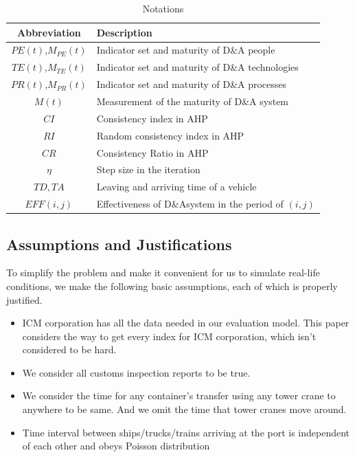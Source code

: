 \documentclass{mcmthesis}
\begin{document}
\begin{table}[!htbp]
    \small
    \setlength{\abovecaptionskip}{0cm}
    \setlength{\belowcaptionskip}{+0.1cm}
    \caption{Notations}
    \label{table::Notations}
    \centering
    \begin{tabular}{cl}  
    \toprule   
    \textbf{Abbreviation} & \textbf{Description}\\  
    \midrule
    $PE(t)$,$M_{PE}(t)$ & Indicator set and maturity of D\&A people \\
    $TE(t)$,$M_{TE}(t)$ & Indicator set and maturity of D\&A technologies \\
    $PR(t)$,$M_{PR}(t)$ & Indicator set and maturity of D\&A processes \\
    $M(t)$ & Measurement of the maturity of D\&A system \\
    $CI$ & Consistency index in AHP\\
    $RI$ & Random consistency index in AHP\\
    $CR$ & Consistency Ratio in AHP\\
    $\eta$ & Step size in the iteration\\
    $TD,TA$ & Leaving and arriving time of a vehicle\\
    $EFF(i,j)$ & Effectiveness of D\&Asystem in the period of $(i,j)$\\

    \bottomrule  
    \end{tabular}
\end{table}%

\subsection{Assumptions and Justifications}
To simplify the problem and make it convenient for us to simulate real-life conditions, we make the following basic assumptions, each of which is properly justified.

\begin{itemize}
\item ICM corporation has all the data needed in our evaluation model. This paper considers the way to get every index for ICM corporation, which isn't considered to be hard. 
\item We consider all customs inspection reports to be true.
\item We consider the time for any container's transfer using any tower crane to anywhere to be same. And we omit the time that tower cranes move around.
\item Time interval between ships/trucks/trains arriving at the port is independent of each other and obeys Poisson distribution
\end{itemize}
\end{document}
